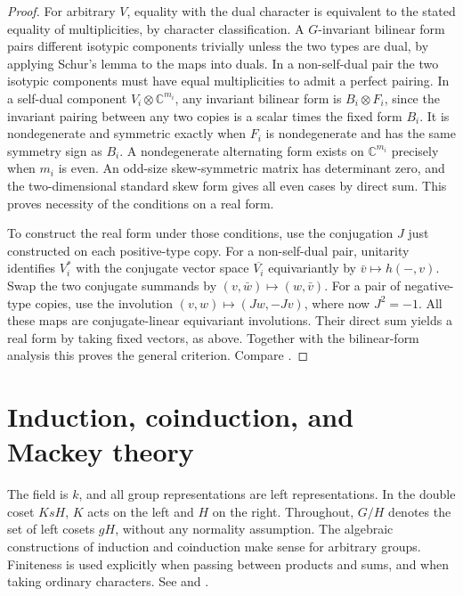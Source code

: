 \documentclass[11pt,oneside,openany]{book}
\theoremstyle{definition}
\theoremstyle{remark}
\begin{document}
\begin{proof}
For arbitrary \(V\), equality with the dual character is equivalent
to the stated equality of multiplicities, by character
classification. A \(G\)-invariant bilinear form pairs different
isotypic components trivially unless the two types are dual, by
applying Schur's lemma to the maps into duals. In a non-self-dual
pair the two isotypic components must have equal multiplicities to
admit a perfect pairing. In a self-dual component
\(V_i\otimes\mathbb C^{m_i}\), any invariant bilinear form is
\(B_i\otimes F_i\), since the invariant pairing between any two
copies is a scalar times the fixed form \(B_i\). It is nondegenerate
and symmetric exactly when \(F_i\) is nondegenerate and has the
same symmetry sign as \(B_i\). A nondegenerate alternating form
exists on \(\mathbb C^{m_i}\) precisely when \(m_i\) is even.
An odd-size skew-symmetric matrix has determinant zero, and
the two-dimensional standard skew form gives all even cases by
direct sum. This proves necessity of the conditions on a real form.

To construct the real form under those conditions, use the
conjugation \(J\) just constructed on each positive-type copy.
For a non-self-dual pair, unitarity identifies \(V_i^*\) with the
conjugate vector space \(\overline{V_i}\) equivariantly by
\(\bar v\mapsto h(-,v)\). Swap the two conjugate summands by
\((v,\bar w)\mapsto(w,\bar v)\). For a pair of negative-type copies,
use the involution \((v,w)\mapsto(Jw,-Jv)\), where now \(J^2=-1\).
All these maps are conjugate-linear equivariant involutions.
Their direct sum yields a real form by taking fixed vectors, as
above. Together with the bilinear-form analysis this proves the
general criterion. Compare \cite[Section 13.2, Theorem 31 and
Proposition 39]{serre}.
\end{proof}
\chapter[Induction and Mackey theory]{Induction, coinduction, and Mackey theory}
\label{p103:ch09}

The field is \(k\), and all group representations are left
representations. In the double coset \(KsH\), \(K\) acts on the left
and \(H\) on the right. Throughout, \(G/H\) denotes the set of
left cosets \(gH\), without any normality assumption.
The algebraic constructions of induction and coinduction make sense
for arbitrary groups. Finiteness is used explicitly when passing
between products and sums, and when taking ordinary characters.
See \cite[Sections 3.3, 7.1--7.4, 8.1 and 9.1--9.3]{serre}
and \cite[Chapter 21]{d07}.
\end{document}
